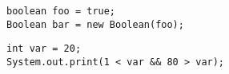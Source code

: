 \documentclass[
  11pt, %
  xcolor=dvipsnames
]{beamer}
\begin{document}
\begin{frame}[fragile]


	\begin{columns}[c]
		\begin{column}{0.9\textwidth}

			\begin{lstlisting}[style=Java]
boolean foo = true;
Boolean bar = new Boolean(foo);
      \end{lstlisting}

			\begin{lstlisting}[style=Java]
int var = 20;
System.out.print(1 < var && 80 > var);
      \end{lstlisting}

		\end{column}
	\end{columns}

\end{frame}
\end{document}
